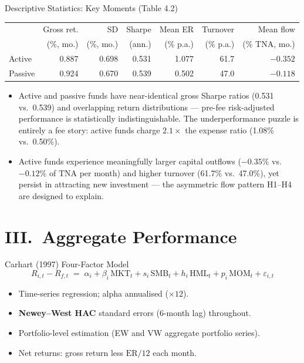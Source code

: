 \documentclass[10pt, aspectratio=169]{beamer}
\begin{document}
\begin{frame}{Descriptive Statistics: Key Moments (Table 4.2)}
  \scriptsize
  \begin{tabular}{lrrrrrr}
    \toprule
    & Gross ret. & SD & Sharpe & Mean ER & Turnover & Mean flow \\
    & (\%, mo.) & (\%, mo.) & (ann.) & (\% p.a.) & (\% p.a.) & (\% TNA, mo.) \\
    \midrule
    Active  & 0.887 & 0.698 & 0.531 & 1.077 & 61.7 & $-0.352$ \\
    Passive & 0.924 & 0.670 & 0.539 & 0.502 & 47.0 & $-0.118$ \\
    \bottomrule
  \end{tabular}
  \vspace{6pt}
  \begin{itemize}\itemsep4pt
    \item Active and passive funds have near-identical gross Sharpe ratios
          (0.531 vs.\ 0.539) and overlapping return distributions — pre-fee
          risk-adjusted performance is statistically indistinguishable.
          The underperformance puzzle is entirely a \alert{fee story}:
          active funds charge $2.1\times$ the expense ratio (1.08\% vs.\ 0.50\%).
    \item Active funds experience meaningfully larger capital outflows
          ($-0.35\%$ vs.\ $-0.12\%$ of TNA per month) and higher turnover
          (61.7\% vs.\ 47.0\%), yet persist in attracting new investment —
          the asymmetric flow pattern H1--H4 are designed to explain.
  \end{itemize}
\end{frame}

\section{III.\ Aggregate Performance}

\begin{frame}{Carhart (1997) Four-Factor Model}
  \[
    R_{i,t} - R_{f,t} \;=\; \alpha_i + \beta_i \,\text{MKT}_t
                            + s_i \,\text{SMB}_t
                            + h_i \,\text{HML}_t
                            + p_i \,\text{MOM}_t
                            + \varepsilon_{i,t}
  \]
  \begin{itemize}\itemsep5pt
    \item Time-series regression; alpha annualised ($\times 12$).
    \item \textbf{Newey–West HAC} standard errors (6-month lag) throughout.
    \item Portfolio-level estimation (EW and VW aggregate portfolio series).
    \item Net returns: gross return less $\text{ER}/12$ each month.
  \end{itemize}
\end{frame}
\end{document}
